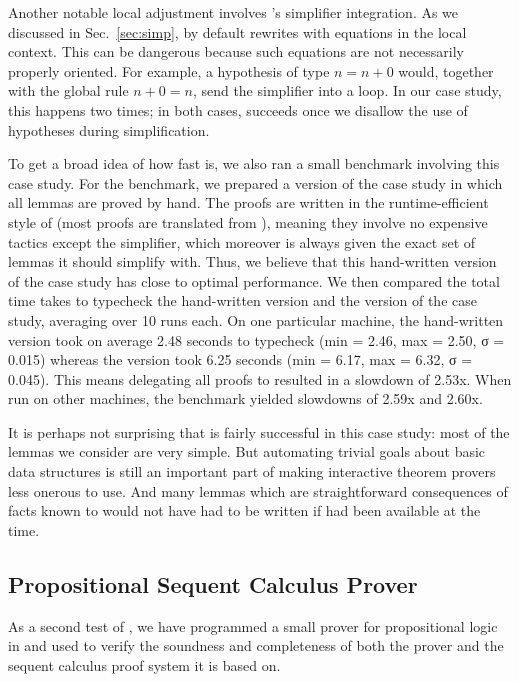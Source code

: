 Another notable local adjustment involves \Aesop's simplifier integration.
As we discussed in Sec.~\ref{sec:simp}, \Aesop{} by default rewrites with equations in the local context.
This can be dangerous because such equations are not necessarily properly oriented.
For example, a hypothesis of type $n = n + 0$ would, together with the global rule $n + 0 = n$, send the simplifier into a loop.
In our case study, this happens two times; in both cases, \Aesop{} succeeds once we disallow the use of hypotheses during simplification.

To get a broad idea of how fast \Aesop{} is, we also ran a small benchmark involving this case study.
For the benchmark, we prepared a version of the case study in which all lemmas are proved by hand.
The proofs are written in the runtime-efficient style of \mathlib{} (most proofs are translated from \Leanthree), meaning they involve no expensive tactics except the simplifier, which moreover is always given the exact set of lemmas it should simplify with.
Thus, we believe that this hand-written version of the case study has close to optimal performance.
We then compared the total time \Lean{} takes to typecheck the hand-written version and the \Aesop{} version of the case study, averaging over 10 runs each.
On one particular machine, the hand-written version took on average 2.48 seconds to typecheck (min = 2.46, max = 2.50, σ = 0.015) whereas the \Aesop{} version took 6.25 seconds (min = 6.17, max = 6.32, σ = 0.045).
This means delegating all proofs to \Aesop{} resulted in a slowdown of 2.53x.
When run on other machines, the benchmark yielded slowdowns of 2.59x and 2.60x.

It is perhaps not surprising that \Aesop{} is fairly successful in this case study: most of the lemmas we consider are very simple.
But automating trivial goals about basic data structures is still an important part of making interactive theorem provers less onerous to use.
And many lemmas which are straightforward consequences of facts known to \Lean{} would not have had to be written if \Aesop{} had been available at the time.


\subsection{Propositional Sequent Calculus Prover}%
\label{sec:leanprover}

As a second test of \Aesop, we have programmed a small prover for propositional logic~\cite{Villadsen20} in \Leanfour{} and used \Aesop{} to verify the soundness and completeness of both the prover and the sequent calculus proof system it is based on.


